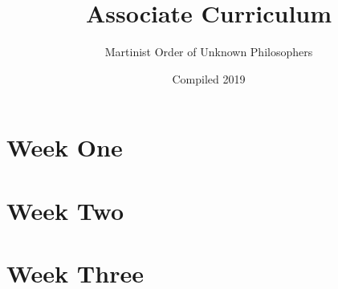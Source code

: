 \documentclass[]{book}
\title{Associate Curriculum}
\author{Martinist Order of Unknown Philosophers}
\date{Compiled 2019}
\begin{document}
	\maketitle
	\tableofcontents
	\chapter{Week One}
		
	\chapter{Week Two}
		
	\chapter{Week Three}
		
	
\end{document}
